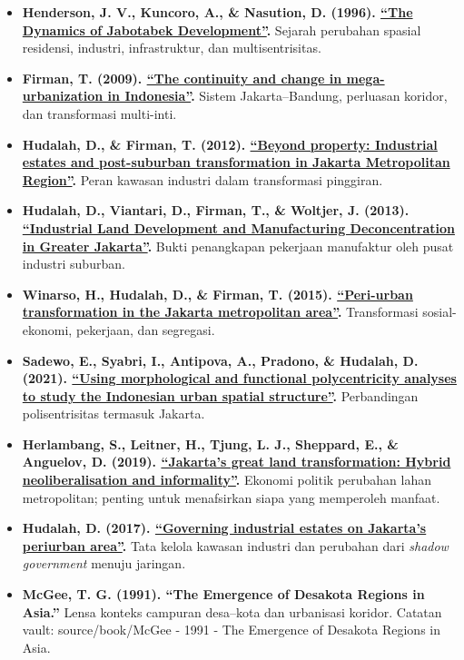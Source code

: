 \documentclass[
  indonesian,
  11pt,
  a4paper,
  oneside,
  openany]{report}
\providecommand{\tightlist}{%
  \setlength{\itemsep}{0pt}\setlength{\parskip}{0pt}}
\begin{document}
\begin{itemize}
\tightlist
\item
  \textbf{Henderson, J. V., Kuncoro, A., \& Nasution, D. (1996).
  \href{https://doi.org/10.1080/00074919612331336898}{``The Dynamics of
  Jabotabek Development''}.} Sejarah perubahan spasial residensi,
  industri, infrastruktur, dan multisentrisitas.
\item
  \textbf{Firman, T. (2009).
  \href{https://doi.org/10.1016/j.habitatint.2008.08.005}{``The
  continuity and change in mega-urbanization in Indonesia''}.} Sistem
  Jakarta--Bandung, perluasan koridor, dan transformasi multi-inti.
\item
  \textbf{Hudalah, D., \& Firman, T. (2012).
  \href{https://doi.org/10.1016/j.cities.2011.07.003}{``Beyond property:
  Industrial estates and post-suburban transformation in Jakarta
  Metropolitan Region''}.} Peran kawasan industri dalam transformasi
  pinggiran.
\item
  \textbf{Hudalah, D., Viantari, D., Firman, T., \& Woltjer, J. (2013).
  \href{https://doi.org/10.1080/02723638.2013.783281}{``Industrial Land
  Development and Manufacturing Deconcentration in Greater Jakarta''}.}
  Bukti penangkapan pekerjaan manufaktur oleh pusat industri suburban.
\item
  \textbf{Winarso, H., Hudalah, D., \& Firman, T. (2015).
  \href{https://doi.org/10.1016/j.habitatint.2015.05.024}{``Peri-urban
  transformation in the Jakarta metropolitan area''}.} Transformasi
  sosial-ekonomi, pekerjaan, dan segregasi.
\item
  \textbf{Sadewo, E., Syabri, I., Antipova, A., Pradono, \& Hudalah, D.
  (2021). \href{https://doi.org/10.1080/10225706.2020.1737829}{``Using
  morphological and functional polycentricity analyses to study the
  Indonesian urban spatial structure''}.} Perbandingan polisentrisitas
  termasuk Jakarta.
\item
  \textbf{Herlambang, S., Leitner, H., Tjung, L. J., Sheppard, E., \&
  Anguelov, D. (2019).
  \href{https://doi.org/10.1177/0042098018756556}{``Jakarta's great land
  transformation: Hybrid neoliberalisation and informality''}.} Ekonomi
  politik perubahan lahan metropolitan; penting untuk menafsirkan siapa
  yang memperoleh manfaat.
\item
  \textbf{Hudalah, D. (2017).
  \href{https://doi.org/10.1111/sjtg.12177}{``Governing industrial
  estates on Jakarta's periurban area''}.} Tata kelola kawasan industri
  dan perubahan dari \emph{shadow government} menuju jaringan.
\item
  \textbf{McGee, T. G. (1991). ``The Emergence of Desakota Regions in
  Asia.''} Lensa konteks campuran desa--kota dan urbanisasi koridor.
  Catatan vault: source/book/McGee - 1991 - The Emergence of Desakota
  Regions in Asia.
\end{itemize}
\end{document}

